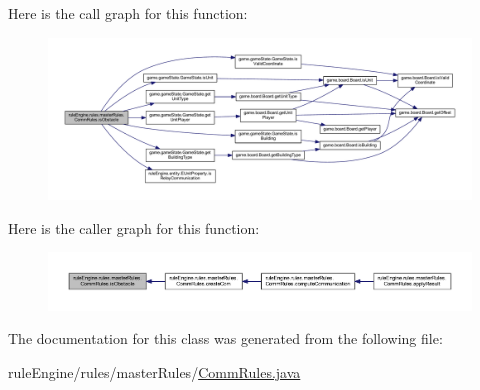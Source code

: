 Here is the call graph for this function\+:
\nopagebreak
\begin{figure}[H]
\begin{center}
\leavevmode
\includegraphics[width=350pt]{classrule_engine_1_1rules_1_1master_rules_1_1_comm_rules_a8ce09b7e1c34043c5a768294cbc6adcd_cgraph}
\end{center}
\end{figure}
Here is the caller graph for this function\+:
\nopagebreak
\begin{figure}[H]
\begin{center}
\leavevmode
\includegraphics[width=350pt]{classrule_engine_1_1rules_1_1master_rules_1_1_comm_rules_a8ce09b7e1c34043c5a768294cbc6adcd_icgraph}
\end{center}
\end{figure}


The documentation for this class was generated from the following file\+:\begin{DoxyCompactItemize}
\item 
rule\+Engine/rules/master\+Rules/\mbox{\hyperlink{_comm_rules_8java}{Comm\+Rules.\+java}}\end{DoxyCompactItemize}
